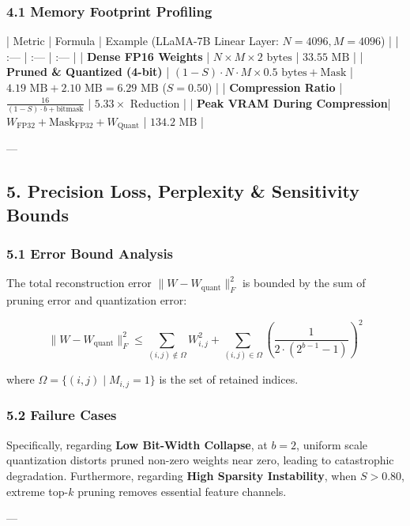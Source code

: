\subsubsection{4.1 Memory Footprint Profiling}

| Metric | Formula | Example (LLaMA-7B Linear Layer: $N=4096, M=4096$) |
| :--- | :--- | :--- |
| \textbf{Dense FP16 Weights} | $N \times M \times 2 \text{ bytes}$ | $33.55 \text{ MB}$ |
| \textbf{Pruned \& Quantized (4-bit)} | $(1 - S) \cdot N \cdot M \times 0.5 \text{ bytes} + \text{Mask}$ | $4.19 \text{ MB} + 2.10 \text{ MB} = 6.29 \text{ MB}$ ($S=0.50$) |
| \textbf{Compression Ratio} | $\frac{16}{(1 - S) \cdot b + \text{bitmask}}$ | $\mathbf{5.33\times}$ Reduction |
| \textbf{Peak VRAM During Compression}| $W_{\text{FP32}} + \text{Mask}_{\text{FP32}} + W_{\text{Quant}}$ | $134.2 \text{ MB}$ |

---

\subsection{5. Precision Loss, Perplexity \& Sensitivity Bounds}
\subsubsection{5.1 Error Bound Analysis}

The total reconstruction error $\| W - W_{\text{quant}} \|_F^2$ is bounded by the sum of pruning error and quantization error:

$$\| W - W_{\text{quant}} \|_F^2 \le \sum_{(i,j) \notin \Omega} W_{i,j}^2 + \sum_{(i,j) \in \Omega} \left( \frac{1}{2 \cdot (2^{b-1} - 1)} \right)^2$$

where $\Omega = \{ (i,j) \mid M_{i,j} = 1 \}$ is the set of retained indices.

\subsubsection{5.2 Failure Cases}

Specifically, regarding \textbf{Low Bit-Width Collapse}, at $b=2$, uniform scale quantization distorts pruned non-zero weights near zero, leading to catastrophic degradation. Furthermore, regarding \textbf{High Sparsity Instability}, when $S > 0.80$, extreme top-$k$ pruning removes essential feature channels.


---